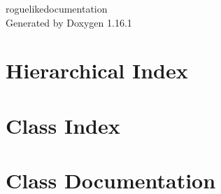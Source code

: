 \documentclass[twoside]{book}
\newcommand{\+}{\discretionary{\mbox{\scriptsize$\hookleftarrow$}}{}{}}
\newcommand{\clearemptydoublepage}{%
    \newpage{\pagestyle{empty}\cleardoublepage}%
  }
\begin{document}
  \raggedbottom
    \hypersetup{pageanchor=false,
                bookmarksnumbered=true,
                pdfencoding=unicode
               }
  \begin{titlepage}
  \vspace*{7cm}
  \begin{center}%
  {\Large roguelikedocumentation}\\
  \vspace*{1cm}
  {\large Generated by Doxygen 1.16.1}\\
  \end{center}
  \end{titlepage}
  \clearemptydoublepage
  \tableofcontents
  \clearemptydoublepage
  \hypersetup{pageanchor=true}

\chapter{Hierarchical Index}

\chapter{Class Index}

\chapter{Class Documentation}















  \backmatter
  \newpage
  \clearemptydoublepage
  \printindex
\end{document}

